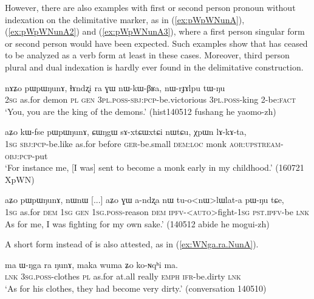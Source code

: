 However, there are also examples with first or second person pronoun without indexation on the delimitative marker, as in (\ref{ex:pWpWNunA}), (\ref{ex:pWpWNunA2}) and (\ref{ex:pWpWNunA3}), where a first person singular form  or second person  would have been expected. Such examples show that  has ceased to be analyzed as a verb form at least in these cases. Moreover, third person plural and dual indexation is hardly ever found in the delimitative construction.

\begin{exe}
\ex \label{ex:pWpWNunA}
\gll nɤʑo pɯpɯŋunɤ, ɬɤndʐi ra ɣɯ nɯ-kɯ-βʁa, nɯ-rɟɤlpu tɯ-ŋu \\
\textsc{2sg} as.for demon \textsc{pl} \textsc{gen} \textsc{3pl}.\textsc{poss}-\textsc{sbj}:\textsc{pcp}-be.victorious \textsc{3pl}.\textsc{poss}-king 2-be:\textsc{fact} \\
\glt `You, you are the king of the demons.' (hist140512 fushang he yaomo-zh)
\end{exe}

\begin{exe}
\ex \label{ex:pWpWNunA2}
\gll  aʑo kɯ-fse pɯpɯŋunɤ, ɕɯŋgɯ sɤ-xtɕɯ\redp{}xtɕi nɯtɕu, χpɯn lɤ-kɤ-ta, \\
\textsc{1sg} \textsc{sbj}:\textsc{pcp}-be.like as.for  before \textsc{ger}-be.small \textsc{dem}:\textsc{loc} monk \textsc{aor}:\textsc{upstream}-\textsc{obj}:\textsc{pcp}-put \\
\glt `For instance me, [I was] sent to become a monk early in my childhood.' (160721 XpWN) 	
\end{exe}

\begin{exe}
\ex \label{ex:pWpWNunA3}
\gll aʑo pɯpɯŋunɤ, nɯnɯ [...] aʑo ɣɯ a-ndʐa nɯ tu-o<nɯ>lɯlat-a pɯ-ŋu tɕe, \\
\textsc{1sg} as.for \textsc{dem} { } \textsc{1sg} \textsc{gen} \textsc{1sg}.\textsc{poss}-reason \textsc{dem} \textsc{ipfv}-<\textsc{auto}>fight-\textsc{1sg} \textsc{pst}.\textsc{ipfv}-be \textsc{lnk} \\
\glt  As for me, I was fighting for my own sake.' (140512 abide he mogui-zh)
 \end{exe}
 
A short form  instead of  is also attested, as in (\ref{ex:WNga.ra.NunA}).

\begin{exe}
\ex \label{ex:WNga.ra.NunA}
\gll ma ɯ-ŋga ra ŋunɤ, maka wuma ʑo ko-ɴqʰi ma. \\
\textsc{lnk} \textsc{3sg}.\textsc{poss}-clothes \textsc{pl} as.for at.all really \textsc{emph} \textsc{ifr}-be.dirty \textsc{lnk} \\
\glt `As for his clothes, they had become very dirty.' (conversation 140510)
\end{exe}
 
